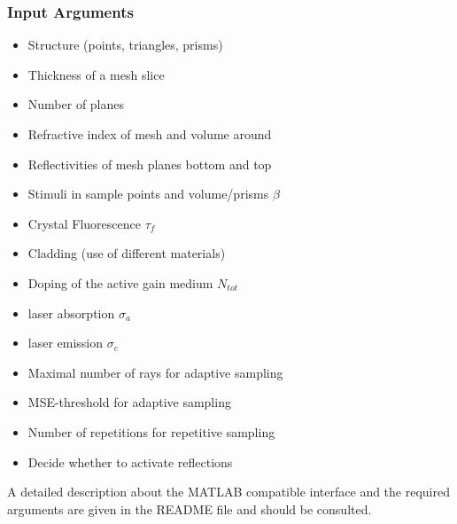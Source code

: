 \subsubsection{Input Arguments}
\begin{description}
  \label{label:input}
  \item[Mesh information]\mbox{}
    \begin{itemize}
      \setlength{\itemindent}{-2.5em}
    \item Structure (points, triangles, prisms)
    \item Thickness of a mesh slice 
    \item Number of planes
    \item Refractive index of mesh and volume around
    \item Reflectivities of mesh planes bottom and top
    \end{itemize}

  \item[Properties]
    \mbox{}
    \begin{itemize}
      \setlength{\itemindent}{-2.5em}
      \item Stimuli in sample points and volume/prisms $\beta$
      \item Crystal Fluorescence $\tau_{f}$
      \item Cladding (use of different materials)
      \item Doping of the active gain medium $N_{tot}$
    \end{itemize}

  \item[Laser information]
    \mbox{}
    \begin{itemize}
      \setlength{\itemindent}{-2.5em}
      \item laser absorption $\sigma_a$
      \item laser emission $\sigma_e$
    \end{itemize}

   \item[Algorithm information]
    \mbox{}
    \begin{itemize}
      \setlength{\itemindent}{-2.5em}
       \item Maximal number of rays for adaptive sampling
       \item MSE-threshold for adaptive sampling
       \item Number of repetitions for repetitive sampling
       \item Decide whether to activate reflections
     \end{itemize}
    
 \end{description}
A detailed description about the MATLAB compatible interface
and the required arguments are given in the README file 
and should be consulted.

